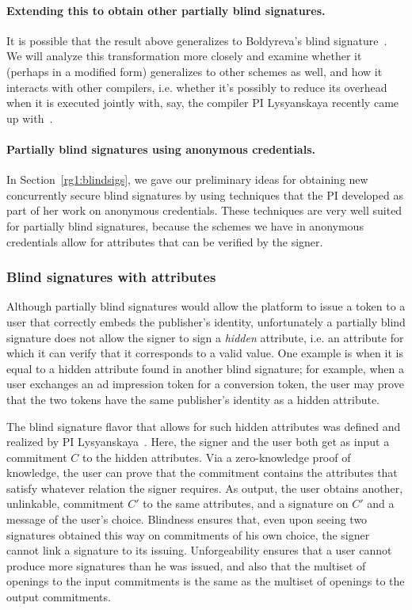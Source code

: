 \paragraph{Extending this to obtain other partially blind signatures.}
It is possible that the result above generalizes to Boldyreva's blind signature~\cite{PKC:Boldyreva03}.  We will analyze this transformation more closely and examine whether it (perhaps in a modified form) generalizes to other schemes as well, and how it interacts with other compilers, i.e. whether it's possibly to reduce its overhead when it is executed jointly with, say, the compiler PI Lysyanskaya recently came up with~\cite{chllw22}.

\paragraph{Partially blind signatures using anonymous credentials.} In Section~\ref{rg1:blindsigs}, we gave our preliminary ideas for obtaining new concurrently secure blind signatures by using techniques that the PI developed as part of her work on anonymous credentials.  These techniques are very well suited for partially blind signatures, because the schemes we have in anonymous credentials allow for attributes that can be verified by the signer.



\subsubsection{Blind signatures with attributes}
\label{rg1:attributes}

Although partially blind signatures would allow the platform to issue a token to a user that correctly embeds the publisher's identity, unfortunately a partially blind signature does not allow the signer to sign a \emph{hidden} attribute, i.e. an attribute for which it can verify that it corresponds to a valid value.  One example is when it is equal to a hidden attribute found in another blind signature; for example, when a user exchanges an ad impression token for a conversion token, the user may prove that the two tokens have the same publisher's identity as a hidden attribute.  

The blind signature flavor that allows for such hidden attributes was defined and realized by PI Lysyanskaya~\cite{CCS:BalLys13}.   Here, the signer and the user both get
as input a commitment $C$ to the hidden attributes.  Via a zero-knowledge proof of knowledge, the user can prove that the commitment
contains the attributes that satisfy whatever relation the signer requires.  As output, the user obtains another, unlinkable, commitment $C'$ to the same attributes, and a signature on $C'$ and a message of the user’s choice. Blindness
ensures that, even upon seeing two signatures obtained this
way on commitments of his own choice, the signer cannot
link a signature to its issuing. Unforgeability ensures that
a user cannot produce more signatures than he was issued,
and also that the multiset of openings to the input commitments is the same as the multiset of openings to the output
commitments.

